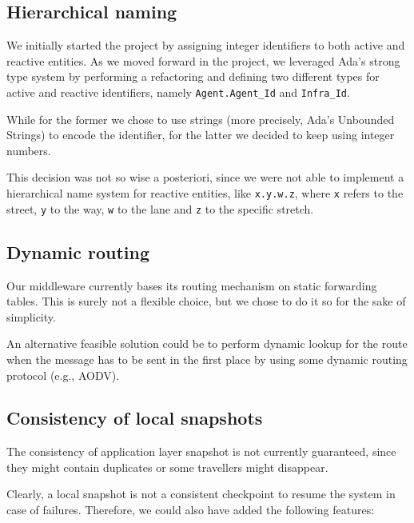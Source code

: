 \subsection{Hierarchical naming}
We initially started the project by assigning integer identifiers to both
active and reactive entities. As we moved forward in the project, we leveraged
Ada's strong type system by performing a refactoring and defining two different
types for active and reactive identifiers, namely \texttt{Agent.Agent\_Id} and
\texttt{Infra\_Id}.

While for the former we chose to use strings (more precisely, Ada's Unbounded
Strings) to encode the identifier, for the latter we decided to keep using
integer numbers.

This decision was not so wise a posteriori, since we were not able to implement
a hierarchical name system for reactive entities, like \texttt{x.y.w.z}, where
\texttt{x} refers to the street, \texttt{y} to the way, \texttt{w} to the lane
and \texttt{z} to the specific stretch.

\subsection{Dynamic routing}
Our middleware currently bases its routing mechanism on static forwarding
tables. This is surely not a flexible choice, but we chose to do it so for the
sake of simplicity.

An alternative feasible solution could be to perform dynamic lookup for the
route when the message has to be sent in the first place by using some dynamic
routing protocol (e.g., AODV).

\subsection{Consistency of local snapshots}
The consistency of application layer snapshot is not currently guaranteed,
since they might contain duplicates or some travellers might disappear.

Clearly, a local snapshot is not a consistent checkpoint to resume the system
in case of failures. Therefore, we could also have added the following
features:

